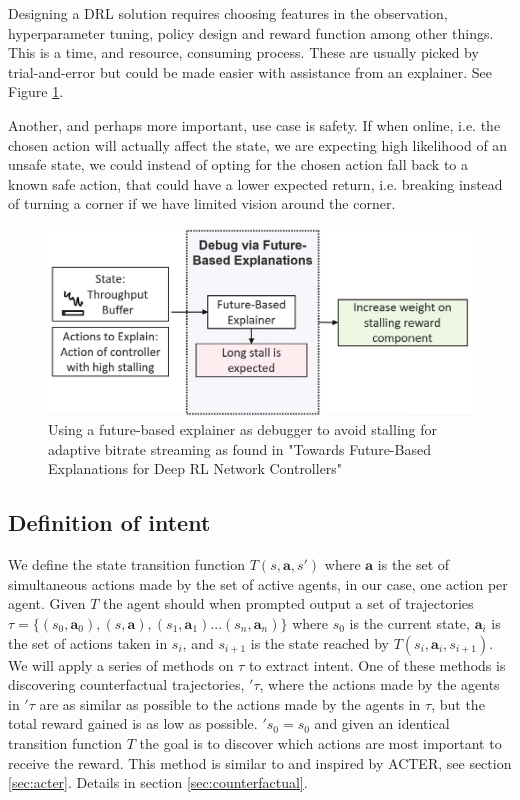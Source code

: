 \documentclass[UKenglish]{uiomasterthesis}
\begin{document}
Designing a DRL solution requires choosing features in the observation,\\ hyperparameter tuning, policy design and reward function among other things. This is a time, and resource, consuming process. These are usually picked by trial-and-error but could be made easier with assistance from an explainer. See Figure \ref{fig:bitrate}. 

Another, and perhaps more important, use case is safety. If when online, i.e. the chosen action will actually affect the state, we are expecting high likelihood of an unsafe state, we could instead of opting for the chosen action fall back to a known safe action, that could have a lower expected return, i.e. breaking instead of turning a corner if we have limited vision around the corner.

\begin{figure}
	\includegraphics[width=\textwidth]{images/dog-final.png}
	\caption{Using a future-based explainer as debugger to avoid stalling for adaptive bitrate streaming as found in "Towards Future-Based Explanations for Deep RL Network Controllers" \cite{10.1145/3626570.3626607}}
	\label{fig:bitrate}
\end{figure}
\medskip

\subsection{Definition of intent}
We define the state transition function $T(s, \textbf{a}, s')$ where $\textbf{a}$ is the set of simultaneous actions made by the set of active agents, in our case, one action per agent. Given $T$ the agent should when prompted output a set of trajectories $\tau = \{(s_0,\textbf{a}_0),(s,\textbf{a}),(s_1,\textbf{a}_1)...(s_n,\textbf{a}_n)\}$ where $s_0$ is the current state, $\textbf{a}_i$ is the set of actions taken in $s_i$, and $s_{i+1}$ is the state reached by $T(s_i,\textbf{a}_i, s_{i+1})$. We will apply a series of methods on $\tau$ to extract intent. One of these methods is discovering counterfactual trajectories, $'\tau$, where the actions made by the agents in $'\tau$ are as similar as possible to the actions made by the agents in $\tau$, but the total reward gained is as low as possible. $'s_0 = s_0$ and given an identical transition function $T$ the goal is to discover which actions are most important to receive the reward. This method is similar to and inspired by ACTER\cite{gajcin2024acter}, see section \ref{sec:acter}. Details in section \ref{sec:counterfactual}.
\end{document}
